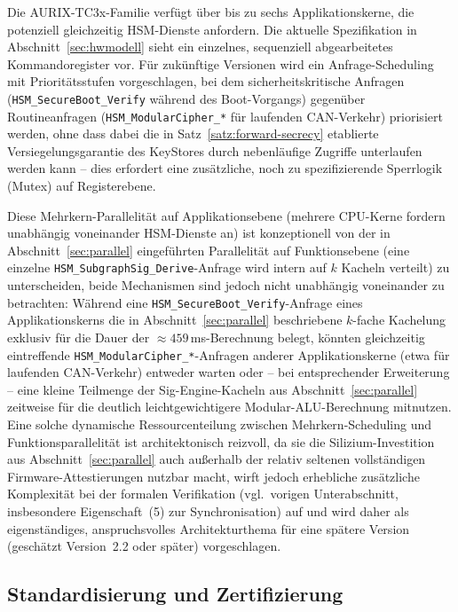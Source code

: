 ﻿\documentclass[a4paper,12pt]{article}
\theoremstyle{definition}
\begin{document}
Die AURIX-TC3x-Familie verfügt über bis zu sechs Applikationskerne, die potenziell gleichzeitig HSM-Dienste anfordern. Die aktuelle Spezifikation in Abschnitt~\ref{sec:hwmodell} sieht ein einzelnes, sequenziell abgearbeitetes Kommandoregister vor. Für zukünftige Versionen wird ein Anfrage-Scheduling mit Prioritätsstufen vorgeschlagen, bei dem sicherheitskritische Anfragen (\texttt{HSM\_SecureBoot\_Verify} während des Boot-Vorgangs) gegenüber Routineanfragen (\texttt{HSM\_ModularCipher\_*} für laufenden CAN-Verkehr) priorisiert werden, ohne dass dabei die in Satz~\ref{satz:forward-secrecy} etablierte Versiegelungsgarantie des KeyStores durch nebenläufige Zugriffe unterlaufen werden kann -- dies erfordert eine zusätzliche, noch zu spezifizierende Sperrlogik (Mutex) auf Registerebene.

Diese Mehrkern-Parallelität auf Applikationsebene (mehrere CPU-Kerne fordern unabhängig voneinander HSM-Dienste an) ist konzeptionell von der in Abschnitt~\ref{sec:parallel} eingeführten Parallelität auf Funktionsebene (eine einzelne \texttt{HSM\_SubgraphSig\_Derive}-Anfrage wird intern auf $k$ Kacheln verteilt) zu unterscheiden, beide Mechanismen sind jedoch nicht unabhängig voneinander zu betrachten: Während eine \texttt{HSM\_SecureBoot\_Verify}-Anfrage eines Applikationskerns die in Abschnitt~\ref{sec:parallel} beschriebene $k$-fache Kachelung exklusiv für die Dauer der $\approx 459$\,ms-Berechnung belegt, könnten gleichzeitig eintreffende \texttt{HSM\_ModularCipher\_*}-Anfragen anderer Applikationskerne (etwa für laufenden CAN-Verkehr) entweder warten oder -- bei entsprechender Erweiterung -- eine kleine Teilmenge der Sig-Engine-Kacheln aus Abschnitt~\ref{sec:parallel} zeitweise für die deutlich leichtgewichtigere Modular-ALU-Berechnung mitnutzen. Eine solche dynamische Ressourcenteilung zwischen Mehrkern-Scheduling und Funktionsparallelität ist architektonisch reizvoll, da sie die Silizium-Investition aus Abschnitt~\ref{sec:parallel} auch außerhalb der relativ seltenen vollständigen Firmware-Attestierungen nutzbar macht, wirft jedoch erhebliche zusätzliche Komplexität bei der formalen Verifikation (vgl.\ vorigen Unterabschnitt, insbesondere Eigenschaft~(5) zur Synchronisation) auf und wird daher als eigenständiges, anspruchsvolles Architekturthema für eine spätere Version (geschätzt Version~2.2 oder später) vorgeschlagen.

\subsection{Standardisierung und Zertifizierung}
\end{document}
